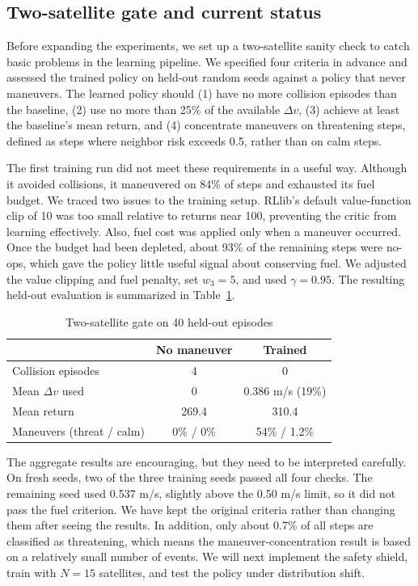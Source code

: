\documentclass[conference]{IEEEtran}
\begin{document}
\subsection{Two-satellite gate and current status}

Before expanding the experiments, we set up a two-satellite sanity check to catch basic problems in the learning pipeline. We specified four criteria in advance and assessed the trained policy on held-out random seeds against a policy that never maneuvers. The learned policy should (1) have no more collision episodes than the baseline, (2) use no more than 25\% of the available $\Delta v$, (3) achieve at least the baseline's mean return, and (4) concentrate maneuvers on threatening steps, defined as steps where neighbor risk exceeds 0.5, rather than on calm steps.

The first training run did not meet these requirements in a useful way. Although it avoided collisions, it maneuvered on 84\% of steps and exhausted its fuel budget. We traced two issues to the training setup. RLlib's default value-function clip of 10 was too small relative to returns near 100, preventing the critic from learning effectively. Also, fuel cost was applied only when a maneuver occurred. Once the budget had been depleted, about 93\% of the remaining steps were no-ops, which gave the policy little useful signal about conserving fuel. We adjusted the value clipping and fuel penalty, set $w_3=5$, and used $\gamma=0.95$. The resulting held-out evaluation is summarized in Table~\ref{tab:gate}.

\begin{table}[t]
\centering
\caption{Two-satellite gate on 40 held-out episodes}
\label{tab:gate}
\small
\setlength{\tabcolsep}{3pt}
\begin{tabular}{@{}lcc@{}}
\toprule
 & No maneuver & Trained \\
\midrule
Collision episodes & 4 & 0 \\
Mean $\Delta v$ used & 0 & 0.386 m/s (19\%) \\
Mean return & 269.4 & 310.4 \\
Maneuvers (threat / calm) & 0\% / 0\% & 54\% / 1.2\% \\
\bottomrule
\end{tabular}
\end{table}

The aggregate results are encouraging, but they need to be interpreted carefully. On fresh seeds, two of the three training seeds passed all four checks. The remaining seed used 0.537 m/s, slightly above the 0.50 m/s limit, so it did not pass the fuel criterion. We have kept the original criteria rather than changing them after seeing the results. In addition, only about 0.7\% of all steps are classified as threatening, which means the maneuver-concentration result is based on a relatively small number of events. We will next implement the safety shield, train with $N=15$ satellites, and test the policy under distribution shift.
\end{document}
